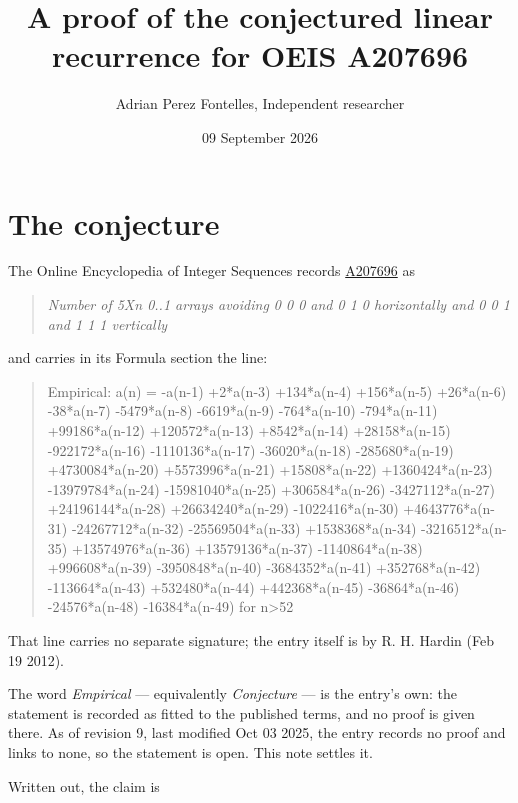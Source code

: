 \documentclass[11pt]{article}
\title{A proof of the conjectured linear recurrence for OEIS A207696}
\author{Adrian Perez Fontelles, Independent researcher}
\date{09 September 2026}
\theoremstyle{definition}
\begin{document}
\maketitle
\section{The conjecture}

The Online Encyclopedia of Integer Sequences records \href{https://oeis.org/A207696}{A207696} as

\begin{quote}\itshape Number of 5Xn 0..1 arrays avoiding 0 0 0 and 0 1 0 horizontally and 0 0 1 and 1 1 1 vertically\end{quote}

and carries in its Formula section the line:

\begin{quote}\ttfamily Empirical: a(n) = -a(n-1) +2*a(n-3) +134*a(n-4) +156*a(n-5) +26*a(n-6) -38*a(n-7) -5479*a(n-8) -6619*a(n-9) -764*a(n-10) -794*a(n-11) +99186*a(n-12) +120572*a(n-13) +8542*a(n-14) +28158*a(n-15) -922172*a(n-16) -1110136*a(n-17) -36020*a(n-18) -285680*a(n-19) +4730084*a(n-20) +5573996*a(n-21) +15808*a(n-22) +1360424*a(n-23) -13979784*a(n-24) -15981040*a(n-25) +306584*a(n-26) -3427112*a(n-27) +24196144*a(n-28) +26634240*a(n-29) -1022416*a(n-30) +4643776*a(n-31) -24267712*a(n-32) -25569504*a(n-33) +1538368*a(n-34) -3216512*a(n-35) +13574976*a(n-36) +13579136*a(n-37) -1140864*a(n-38) +996608*a(n-39) -3950848*a(n-40) -3684352*a(n-41) +352768*a(n-42) -113664*a(n-43) +532480*a(n-44) +442368*a(n-45) -36864*a(n-46) -24576*a(n-48) -16384*a(n-49) for n>52\end{quote}

That line carries no separate signature; the entry itself is by R. H. Hardin (Feb 19 2012).

The word {\itshape Empirical} --- equivalently {\itshape Conjecture} --- is the entry's own: the statement is recorded as fitted to the published terms, and no proof is given there. As of revision 9, last modified Oct 03 2025, the entry records no proof and links to none, so the statement is open. This note settles it.

Written out, the claim is
\end{document}
